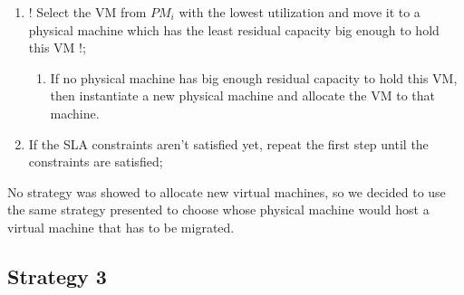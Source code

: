 \begin{enumerate}
	\item ! Select the VM from $PM_i$ with the lowest utilization and move it to a physical machine which has the least residual capacity big enough to hold this VM !;
	\begin{enumerate}
		\item If no physical machine has big enough residual capacity to hold this VM, then instantiate a new physical machine and allocate the VM to that machine.
	\end{enumerate}
	\item If the SLA constraints aren't satisfied yet, repeat the first step until the constraints are satisfied;
\end{enumerate}

No strategy was showed to allocate new virtual machines, so we decided to use the same strategy presented to choose whose physical machine would host a virtual machine that has to be migrated.


\subsection{Strategy 3}
